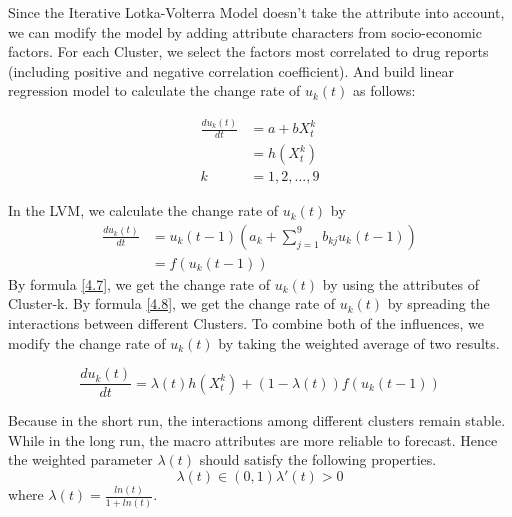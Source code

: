\documentclass[12pt]{article}
\begin{document}
Since the Iterative Lotka-Volterra Model doesn’t take the attribute into account, we can modify the model by adding attribute characters from socio-economic factors. For each Cluster, we select the factors most correlated to drug reports (including positive and negative correlation coefficient). And build linear regression model to calculate the change rate of $u_k(t)$ as follows:

\begin{equation}
	\begin{aligned}
		\frac{du_{k}(t)}{dt} &= a + bX_{t}^{k} \\
		&=h(X_{t}^{k}) \\
		k &= 1,2,...,9
	\end{aligned}
	\label{4.7}
\end{equation}

In the LVM, we calculate the change rate of $u_{k}(t)$ by
\begin{equation}
	\begin{aligned}
	\frac{du_{k}(t)}{dt} &= u_{k}(t-1)(a_{k} + \sum_{j=1}^{9}b_{kj}u_{k}(t-1)) \\
	&=f(u_{k}(t-1))
	\end{aligned}
	\label{4.8}
\end{equation}
By formula \ref{4.7}, we get the change rate of $u_k(t)$ by using the attributes of Cluster-k. By formula \ref{4.8}, we get the change rate of $u_k(t)$ by spreading the interactions between different Clusters. To combine both of the influences, we modify the change rate of $u_k (t)$ by taking the weighted average of two results.

\begin{equation}
	\frac{du_{k}(t)}{dt} = \lambda(t)h(X_{t}^{k}) + (1-\lambda(t))f(u_{k}(t-1))
\end{equation}

Because in the short run, the interactions among different clusters remain stable. While in the long run, the macro attributes are more reliable to forecast. Hence the weighted parameter $\lambda(t)$ should satisfy the following properties. 
\begin{equation}
	\lambda(t) \in (0, 1) \lambda'(t) > 0
\end{equation}
where $\lambda(t) = \frac{ln(t)}{1+ln(t)}$.
\end{document}
